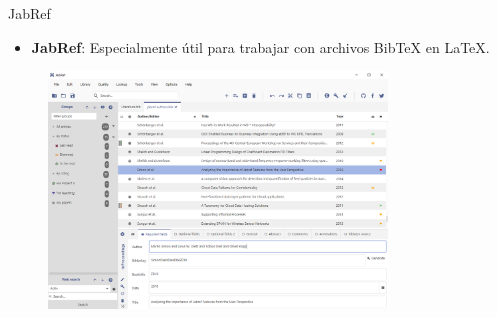 \documentclass[
11pt, %
]{beamer}
\begin{document}
\begin{frame}{JabRef}
	\begin{itemize}
		\item \textbf{JabRef}: Especialmente útil para trabajar con archivos BibTeX en LaTeX.
	\end{itemize}
	\begin{figure}[h!]
		\centering
		\includegraphics[width=9cm]{jabref.png}
	\end{figure}
\end{frame}
\end{document}
